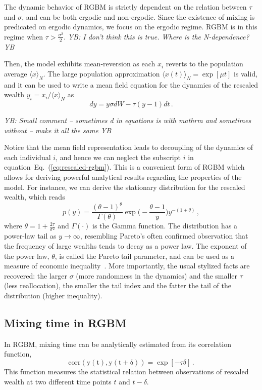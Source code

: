 \documentclass[11pt]{article}
\newcommand{\blue}[1]{{\color{blue} #1}}
\newcommand{\eref}[1]{Eq.~(\ref{eq:#1})}
\newcommand{\YB}[1]{\blue{{\it YB: #1 YB}}}
\newcommand{\be}{\begin{equation}}
\newcommand{\ee}{\end{equation}}
\numberwithin{equation}{section}
\begin{document}
The dynamic behavior of RGBM is strictly dependent on the relation between $\tau$ and $\sigma$, and can be both ergodic and non-ergodic. Since the existence of mixing is predicated on ergodic dynamics, we focus on the ergodic regime. RGBM is in this regime when $\tau > \frac{\sigma^2}{2}$.
\YB{I don't think this is true. Where is the N-dependence?}

Then, the model exhibits mean-reversion as each $x_i$ reverts to the population average $\langle x \rangle_N$. The large population approximation $\langle x(t) \rangle_N = \exp \left[\mu t\right]$ is valid, and it can be used to write a mean field equation for the dynamics of the rescaled wealth $y_i = x_i / \langle x \rangle_N$ as
%
\be
    d y =   y \sigma d W - \tau (y - 1) dt\,.
    \label{eq:rescaled-rgbm}
\ee
%

\YB{Small comment -- sometimes d in equations is with mathrm and sometimes without -- make it all the same}

Notice that the mean field representation leads to decoupling of the dynamics of each individual $i$, and hence we can neglect the subscript $i$ in equation~\eref{rescaled-rgbm}. This is a convenient form of RGBM which allows for deriving powerful analytical results regarding the properties of the model. For instance, we can derive the stationary distribution for the rescaled wealth, which reads
%
\be
p(y) = \frac{(\theta - 1)^{\theta}}{\Gamma(\theta)} \exp{\big(-\frac{\theta - 1}{y}\big)} y^{-(1+\theta)}\,,
\label{eq:rgbm-stationary-distribution}
\ee
%
where $\theta = 1 + \frac{2 \tau}{\sigma^2}$ and $\Gamma(\cdot)$ is the Gamma function. The distribution has a power-law tail as $y \to \infty$,
resembling Pareto's often confirmed observation that the frequency of large wealths tends to decay as a power law. The exponent of the power law, $\theta$, is called the Pareto tail parameter, and can be used as a measure of economic inequality~\citep{Cowell2011}. More importantly, the usual stylized facts are recovered: the larger $\sigma$ (more randomness in the dynamics) and the smaller $\tau$ (less reallocation), the smaller the tail index and the fatter the tail of the distribution (higher inequality).

\subsection{Mixing time in RGBM}

In RGBM, mixing time can be analytically estimated from its correlation function,
%
\be
\mathrm{corr(y(t), y(t+\delta))} = \exp\left[ -\tau \delta \right]\,.
\label{eq:rgbm-correlation}
\ee
%
This function measures the statistical relation between observations of rescaled wealth at two different time points $t$ and $t-\delta$. 
\end{document}
